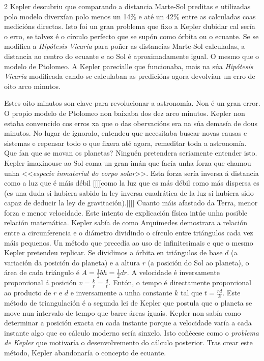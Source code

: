 \begin{multicols}{2}
Kepler descubriu que comparando a distancia Marte-Sol preditas e utilizadas
polo modelo diverxían polo menos un 14\% e até un 42\% entre as calculadas coas
medicións directas. Isto foi un gran problema que fixo a Kepler dubidar cal
sería o erro, se talvez é o círculo perfecto que se supón como órbita ou o
ecuante. Se se modifica a \textit{Hipótesis Vicaria} para poñer as distancias
Marte-Sol calculadas, a distancia ao centro do ecuante e ao Sol é
aproximadamente igual. O mesmo que o modelo de Ptolomeo. A Kepler parecíalle
que funcionaba, mais na súa \textit{Hipótesis Vicaria} modificada cando se
calculaban as predicións agora devolvían un erro de oito arco minutos.

Estes oito minutos son clave para revolucionar a astronomía. Non é un gran
error. O propio modelo de Ptolomeo non baixaba dos dez arco minutos. Kepler non
estaba convencido cos erros xa que o das obervacións era na súa demasía de dous
minutos. No lugar de ignoralo, entendeu que necesitaba buscar novas causas e
sistemas e repensar todo o que fixera até agora, remeditar toda a astronomía.
Que fan que se movan os planetas? Ninguén pretendera seriamente entender isto.
Kepler imaxinouse ao Sol coma un gran imán que facía unha forza que chamou unha
<<\textit{especie inmaterial do corpo solar}>>. Esta forza sería inversa á
distancia como a luz que é máis débil [[[[como la luz que es más débil como más
dispersa es (es una duda si hubiera sabido la ley inversa cuadrática de la luz
si hubiera sido capaz de deducir la ley de gravitación).]]]] Cuanto máis
afastado da Terra, menor forza e menor velocidade. Este intento de explicación
física intúe unha posible relación matemática. Kepler sabía de como Arquímedes
demostrara a relación entre a circunferencia e o diámetro dividindo o círculo
entre triángulos cada vez máis pequenos. Un método que precedía ao uso de
infinitesimais  e que o mesmo Kepler pretendeu replicar. Se dividimos a órbita
en triángulos de base $d$ (a variación da posición do planeta) e a altura $r$
(a posición do Sol ao planeta), o área de cada triángulo é
$A=\frac{1}{2}bh=\frac{1}{2}dr$. A velocidade é inversamente proporcional á
posición $v=\frac{k}{r}=\frac{d}{t}$. Entón, o tempo é directamente
proporcional ao producto de $r$ e $d$ e inversamente a unha constante $k$ tal
que $t=\frac{rd}{k}$. Este método de triangulación é a segunda lei de Kepler
que postula que o planeta se move nun intervalo de tempo que barre áreas
iguais. Kepler non sabía como determinar a posición exacta en cada instante
porque a velocidade varía a cada instante algo que co cálculo moderno sería
sinxelo. Isto coñécese como o \textit{problema de Kepler} que motivaría o
desenvolvemento do cálculo posterior. Tras crear este método, Kepler
abandonaría o concepto de ecuante.


\end{multicols}
